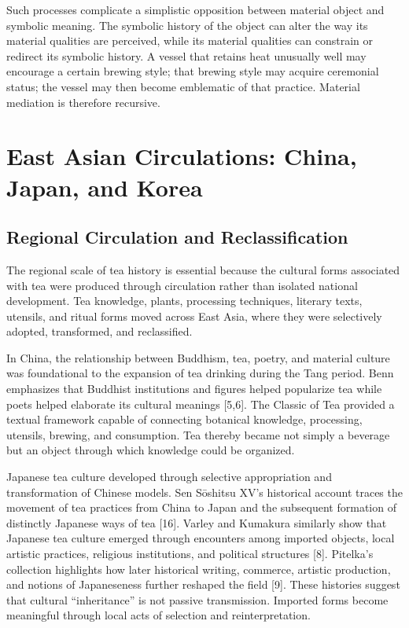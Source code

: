\documentclass[11pt,a4paper]{article}
\begin{document}
Such processes complicate a simplistic opposition between material object and symbolic meaning. The symbolic history of the object can alter the way its material qualities are perceived, while its material qualities can constrain or redirect its symbolic history. A vessel that retains heat unusually well may encourage a certain brewing style; that brewing style may acquire ceremonial status; the vessel may then become emblematic of that practice. Material mediation is therefore recursive.

\section{East Asian Circulations: China, Japan, and Korea}

\subsection{Regional Circulation and Reclassification}

The regional scale of tea history is essential because the cultural forms associated with tea were produced through circulation rather than isolated national development. Tea knowledge, plants, processing techniques, literary texts, utensils, and ritual forms moved across East Asia, where they were selectively adopted, transformed, and reclassified.

In China, the relationship between Buddhism, tea, poetry, and material culture was foundational to the expansion of tea drinking during the Tang period. Benn emphasizes that Buddhist institutions and figures helped popularize tea while poets helped elaborate its cultural meanings [5,6]. The Classic of Tea provided a textual framework capable of connecting botanical knowledge, processing, utensils, brewing, and consumption. Tea thereby became not simply a beverage but an object through which knowledge could be organized.

Japanese tea culture developed through selective appropriation and transformation of Chinese models. Sen Sōshitsu XV's historical account traces the movement of tea practices from China to Japan and the subsequent formation of distinctly Japanese ways of tea [16]. Varley and Kumakura similarly show that Japanese tea culture emerged through encounters among imported objects, local artistic practices, religious institutions, and political structures [8]. Pitelka's collection highlights how later historical writing, commerce, artistic production, and notions of Japaneseness further reshaped the field [9]. These histories suggest that cultural ``inheritance'' is not passive transmission. Imported forms become meaningful through local acts of selection and reinterpretation.
\end{document}
